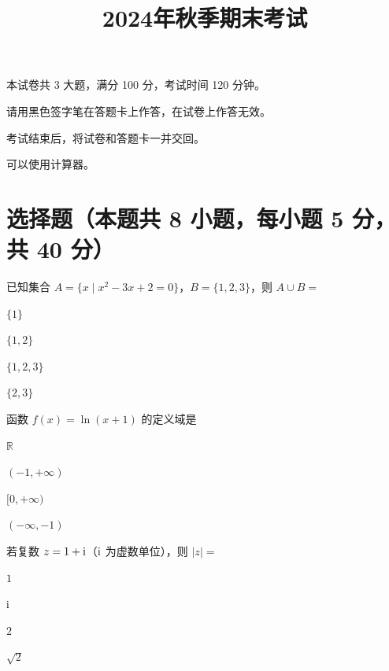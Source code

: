\documentclass{exam-zh}
\begin{document}
\title{2024年秋季期末考试}
\subject{数学}
\maketitle


\begin{notice}
  \item 本试卷共 3 大题，满分 100 分，考试时间 120 分钟。
  \item 请用黑色签字笔在答题卡上作答，在试卷上作答无效。
  \item 考试结束后，将试卷和答题卡一并交回。
  \item 可以使用计算器。
\end{notice}

\vspace{1em}

\section{选择题（本题共 8 小题，每小题 5 分，共 40 分）}

\begin{question}
  已知集合 $A = \{x \mid x^2 - 3x + 2 = 0\}$，$B = \{1, 2, 3\}$，则 $A \cup B = $ \paren[C]
  \begin{choices}
    \item $\{1\}$
    \item $\{1, 2\}$
    \item $\{1, 2, 3\}$
    \item $\{2, 3\}$
  \end{choices}
\end{question}

\begin{question}
  函数 $f(x) = \ln(x + 1)$ 的定义域是\paren[B]
  \begin{choices}
    \item $\mathbb{R}$
    \item $(-1, +\infty)$
    \item $[0, +\infty)$
    \item $(-\infty, -1)$
  \end{choices}
\end{question}

\begin{question}
  若复数 $z = 1 + \mathrm{ i }$（$\mathrm{ i }$ 为虚数单位），则 $|z| = $ \paren[D]
  \begin{choices}
    \item $1$
    \item $\mathrm{ i }$
    \item $2$
    \item $\sqrt{2}$
  \end{choices}
\end{question}
\end{document}
